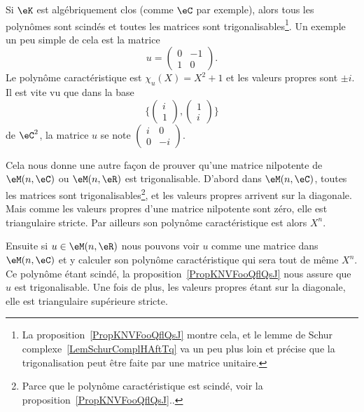 \begin{remark}  \label{RemXFZTooXkGzQg}
    Si \( \eK\) est algébriquement clos (comme \( \eC\) par exemple), alors tous les polynômes sont scindés et toutes les matrices sont trigonalisables\footnote{La proposition~\ref{PropKNVFooQflQsJ} montre cela, et le lemme de Schur complexe~\ref{LemSchurComplHAftTq} va un peu plus loin et précise que la trigonalisation peut être faite par une matrice unitaire.}. Un exemple un peu simple de cela est la matrice
    \begin{equation}
        u=\begin{pmatrix}
            0    &   -1    \\
            1    &   0
        \end{pmatrix}.
    \end{equation}
    Le polynôme caractéristique est \( \chi_u(X)=X^2+1\) et les valeurs propres sont \( \pm i\). Il est vite vu que dans la base
    \begin{equation}
        \{ \begin{pmatrix}
        i    \\
    1
\end{pmatrix}, \begin{pmatrix}
1    \\
i
\end{pmatrix}\}
    \end{equation}
    de \( \eC^2\), la matrice \( u\) se note \( \begin{pmatrix}
        i    &   0    \\
        0    &   -i
    \end{pmatrix}\).
\end{remark}

\begin{remark}  \label{RemREOSooGEDJWX}
    Cela nous donne une autre façon de prouver qu'une matrice nilpotente de \( \eM(n,\eC)\) ou \( \eM(n,\eR)\) est trigonalisable\cite{KDUFooVxwqlC}. D'abord dans \( \eM(n,\eC)\), toutes les matrices sont trigonalisables\footnote{Parce que le polynôme caractéristique est scindé, voir la proposition~\ref{PropKNVFooQflQsJ}..}, et les valeurs propres arrivent sur la diagonale. Mais comme les valeurs propres d'une matrice nilpotente sont zéro, elle est triangulaire stricte. Par ailleurs son polynôme caractéristique est alors \( X^n\).

    Ensuite si \( u\in \eM(n,\eR)\) nous pouvons voir \( u\) comme une matrice dans \( \eM(n,\eC)\) et y calculer son polynôme caractéristique qui sera tout de même \( X^n\). Ce polynôme étant scindé, la proposition~\ref{PropKNVFooQflQsJ} nous assure que \( u\) est trigonalisable. Une fois de plus, les valeurs propres étant sur la diagonale, elle est triangulaire supérieure stricte.
\end{remark}

